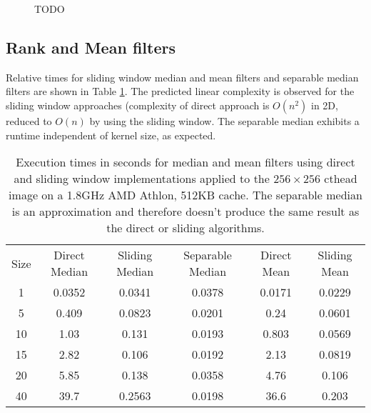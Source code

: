 \documentclass{InsightArticle}
\begin{document}
\begin{figure}[htbp]
\begin{center}
\caption{TODO}
\end{center}
\end{figure}

\subsection{Rank and Mean filters}
Relative times for sliding window median and mean filters and
separable median filters are shown in Table \ref{tab:perfRank}. The
predicted linear complexity is observed for the sliding window
approaches (complexity of direct approach is $O(n^2)$ in 2D, reduced
to $O(n)$ by using the sliding window. The separable median exhibits a
runtime independent of kernel size, as expected.
\begin{table}[htbp]
\centering
\begin{tabular}{cccccc}
\hline
Size  &  Direct Median &  Sliding Median & Separable Median & Direct Mean & Sliding Mean\\
1     &   0.0352 & 0.0341 & 0.0378 & 0.0171 & 0.0229\\
5     &   0.409  & 0.0823  & 0.0201 & 0.24  &  0.0601 \\
10    &   1.03   & 0.131 & 0.0193 & 0.803 &  0.0569 \\
15    &   2.82   & 0.106  & 0.0192 & 2.13  &  0.0819 \\
20    &   5.85   & 0.138  & 0.0358 & 4.76  &  0.106 \\
40    &   39.7   & 0.2563  & 0.0198 & 36.6  &  0.203 \\
\hline
\hline
\end{tabular}
\caption{Execution times in seconds for median and mean filters using direct and sliding window implementations applied to the $256 \times 256$ cthead image on a 1.8GHz AMD Athlon, 512KB cache. The separable median is an approximation and therefore doesn't produce the same result as the direct or sliding algorithms.\label{tab:perfRank}}
\end{table}
\end{document}
